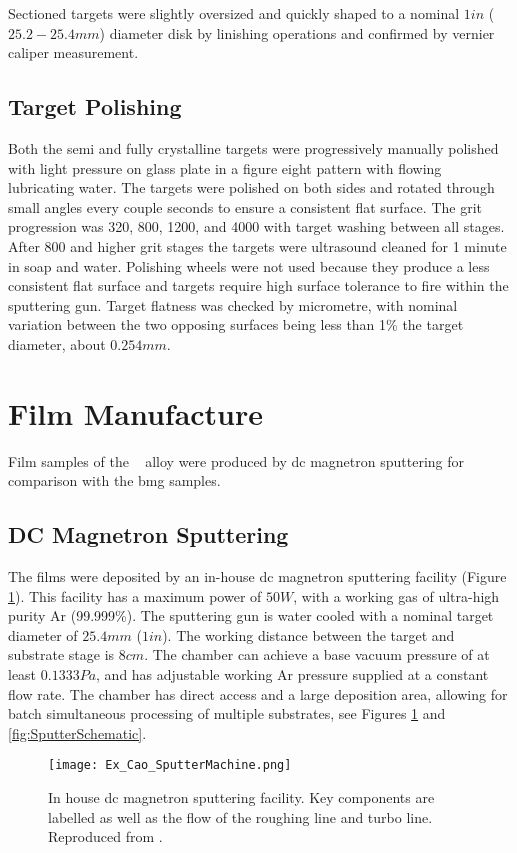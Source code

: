 Sectioned targets were slightly oversized and quickly shaped to a nominal $1 in$ ($25.2 - 25.4 mm$) diameter disk by linishing operations and confirmed by vernier caliper measurement.

\subsection{Target Polishing}
Both the semi and fully crystalline targets were progressively manually polished with light pressure on glass plate in a figure eight pattern with flowing lubricating water. The targets were polished on both sides and rotated through small angles every couple seconds to ensure a consistent flat surface. The grit progression was 320, 800, 1200, and 4000 with target washing between all stages. After 800 and higher grit stages the targets were ultrasound cleaned for 1 minute in soap and water. Polishing wheels were not used because they produce a less consistent flat surface and targets require high surface tolerance to fire within the sputtering gun. Target flatness was checked by micrometre, with nominal variation between the two opposing surfaces being less than 1\% the target diameter, about $0.254 mm$. 

\section{Film Manufacture}
Film samples of the \MgZnCa~ alloy were produced by \gls{dc} magnetron sputtering for comparison with the \gls{bmg} samples. 

\subsection{DC Magnetron Sputtering}
The films were deposited by an in-house \acrshort{dc} magnetron sputtering facility (Figure \ref{fig:CaoSputtering}). This facility has a maximum power of $50 W$, with a working gas of ultra-high purity Ar (99.999\%). The sputtering gun is water cooled with a nominal target diameter of $25.4 mm$ ($1 in$). The working distance between the target and substrate stage is $8 cm$. The chamber can achieve a base vacuum pressure of at least $0.1333 Pa$, and has adjustable working Ar pressure supplied at a constant flow rate. The chamber has direct access and a large deposition area, allowing for batch simultaneous processing of multiple substrates, see Figures \ref{fig:CaoSputtering} and \ref{fig:SputterSchematic}.

\begin{figure}[htbp]
	\centering
	\texttt{[image: Ex\_Cao\_SputterMachine.png]}
	\caption[In-house \acrshort{dc} magnetron sputtering facility. Key components are labelled as well as the flow of the roughing line and turbo line.]{In house \acrshort{dc} magnetron sputtering facility. Key components are labelled as well as the flow of the roughing line and turbo line. Reproduced from \cite{Cao2013}.}
	\label{fig:CaoSputtering}
\end{figure}

